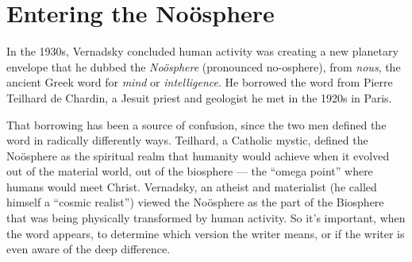 \documentclass[11pt,a4paper]{article}
\begin{document}
\section*{Entering the Noösphere}

In the 1930s, Vernadsky concluded human activity was creating a new planetary
envelope that he dubbed the \emph{Noösphere} (pronounced no-osphere), from
\emph{nous}, the ancient Greek word for \emph{mind} or \emph{intelligence}. He
borrowed the word from Pierre Teilhard de Chardin, a Jesuit priest and
geologist he met in the 1920s in Paris.

That borrowing has been a source of confusion, since the two men defined the
word in radically differently ways. Teilhard, a Catholic mystic, defined the
Noösphere as the spiritual realm that humanity would achieve when it evolved
out of the material world, out of the biosphere — the “omega point” where
humans would meet Christ. Vernadsky, an atheist and materialist (he called
himself a “cosmic realist”) viewed the Noösphere as the part of the Biosphere
that was being physically transformed by human activity. So it’s important,
when the word appears, to determine which version the writer means, or if the
writer is even aware of the deep difference.
\end{document}
